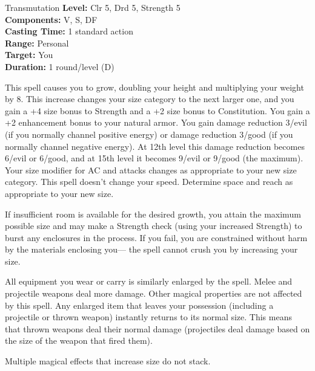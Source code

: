 {Transmutation}
{
	\textbf{Level:}
	Clr 5, Drd 5, Strength 5\\
	\textbf{Components:}
	V, S, DF\\
	\textbf{Casting Time:}
	1 standard action\\
	\textbf{Range:}
	Personal\\
	\textbf{Target:}
	You\\
	\textbf{Duration:}
	1 round/level (D)\\
}
{
	This spell causes you to grow, doubling your height and multiplying your weight by 8. This increase changes your size category to the next larger one, and you gain a +4 size bonus to Strength and a +2 size bonus to Constitution. You gain a +2 enhancement bonus to your natural armor. You gain damage reduction 3/evil (if you normally channel positive energy) or damage reduction 3/good (if you normally channel negative energy). At 12th level this damage reduction becomes 6/evil or 6/good, and at 15th level it becomes 9/evil or 9/good (the maximum). Your size modifier for AC and attacks changes as appropriate to your new size category. This spell doesn't change your speed. Determine space and reach as appropriate to your new size.

	If insufficient room is available for the desired growth, you attain the maximum possible size and may make a Strength check (using your increased Strength) to burst any enclosures in the process. If you fail, you are constrained without harm by the materials enclosing you--- the spell cannot crush you by increasing your size.

	All equipment you wear or carry is similarly enlarged by the spell. Melee and projectile weapons deal more damage. Other magical properties are not affected by this spell. Any enlarged item that leaves your possession (including a projectile or thrown weapon) instantly returns to its normal size. This means that thrown weapons deal their normal damage (projectiles deal damage based on the size of the weapon that fired them).

	Multiple magical effects that increase size do not stack.

}
